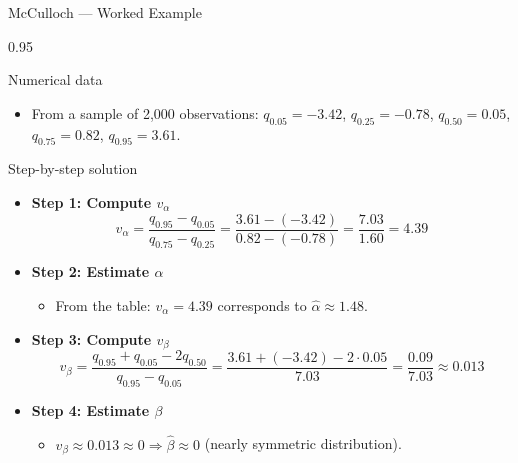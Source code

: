 \documentclass[9pt, aspectratio=169, t]{beamer}
\begin{document}
\begin{frame}{McCulloch --- Worked Example}
    \begin{cminipage}{0.95\textwidth}
\begin{block}{Numerical data}
\begin{itemize}\setlength{\itemsep}{0pt}
    \item From a sample of 2{,}000 observations: $q_{0.05} = -3.42$, $q_{0.25} = -0.78$, $q_{0.50} = 0.05$, $q_{0.75} = 0.82$, $q_{0.95} = 3.61$.
\end{itemize}
\end{block}

\begin{exampleblock}{Step-by-step solution}
\begin{itemize}\setlength{\itemsep}{0pt}
    \item \textbf{Step 1: Compute $v_\alpha$}
$$v_\alpha = \frac{q_{0.95} - q_{0.05}}{q_{0.75} - q_{0.25}} = \frac{3.61 - (-3.42)}{0.82 - (-0.78)} = \frac{7.03}{1.60} = 4.39$$
    \item \textbf{Step 2: Estimate $\alpha$}
    \begin{itemize}\setlength{\itemsep}{0pt}
        \item From the table: $v_\alpha = 4.39$ corresponds to $\hat{\alpha} \approx 1.48$.
    \end{itemize}
    \item \textbf{Step 3: Compute $v_\beta$}
$$v_\beta = \frac{q_{0.95} + q_{0.05} - 2q_{0.50}}{q_{0.95} - q_{0.05}} = \frac{3.61 + (-3.42) - 2 \cdot 0.05}{7.03} = \frac{0.09}{7.03} \approx 0.013$$
    \item \textbf{Step 4: Estimate $\beta$}
    \begin{itemize}\setlength{\itemsep}{0pt}
        \item $v_\beta \approx 0.013 \approx 0 \Rightarrow \hat{\beta} \approx 0$ (nearly symmetric distribution).
    \end{itemize}
\end{itemize}
\end{exampleblock}
    \end{cminipage}
\end{frame}
\end{document}
